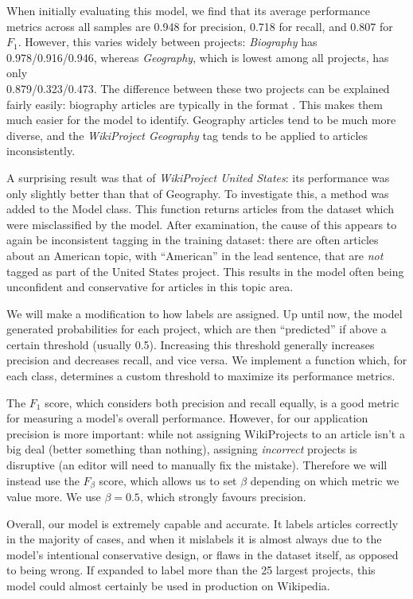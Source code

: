 \documentclass{article}
\newcommand*{\code}[1]{\texttt{\detokenize{#1}}}
\begin{document}
When initially evaluating this model, we find that its average performance metrics across
all samples are 0.948 for precision, 0.718 for recall, and 0.807 for $F_1$. However, this
varies widely between projects: \textit{Biography} has 0.978/0.916/0.946, whereas \textit{Geography},
which is lowest among all projects, has only\\ 0.879/0.323/0.473. The difference between
these two projects can be explained fairly easily: biography articles are typically in
the format \code{[name] ([birth] - [death]) is/was a [nationality] [occupation]}. This
makes them much easier for the model to identify. Geography articles tend to be much more
diverse, and the \textit{WikiProject Geography} tag tends to be applied to articles
inconsistently.

A surprising result was that of \textit{WikiProject United States}: its performance was
only slightly better than that of Geography. To investigate this, a \code{wrong_where}
method was added to the Model class. This function returns articles from the dataset which
were misclassified by the model. After examination, the cause of this appears to again be
inconsistent tagging in the training dataset: there are often articles about an American
topic, with ``American'' in the lead sentence, that are \textit{not} tagged as part of
the United States project. This results in the model often being unconfident and conservative
for articles in this topic area.

We will make a modification to how labels are assigned. Up until now, the model generated
probabilities for each project, which are then ``predicted'' if above a certain threshold
(usually 0.5). Increasing this threshold generally increases precision and decreases recall,
and vice versa. We implement a function \code{optimize_thresholds} which, for each class,
determines a custom threshold to maximize its performance metrics.

The $F_1$ score, which considers both precision and recall equally, is a good metric for
measuring a model's overall performance. However, for our application precision is more
important: while not assigning WikiProjects to an article isn't a big deal (better
something than nothing), assigning \textit{incorrect} projects is disruptive (an editor
will need to manually fix the mistake). Therefore we will instead use the $F_\beta$ score,
which allows us to set $\beta$ depending on which metric we value more. We use $\beta=0.5$,
which strongly favours precision.

Overall, our model is extremely capable and accurate. It labels articles correctly in the
majority of cases, and when it mislabels it is almost always due to the model's intentional
conservative design, or flaws in the dataset itself, as opposed to being wrong. If expanded
to label more than the 25 largest projects, this model could almost certainly be used in
production on Wikipedia.
\end{document}

